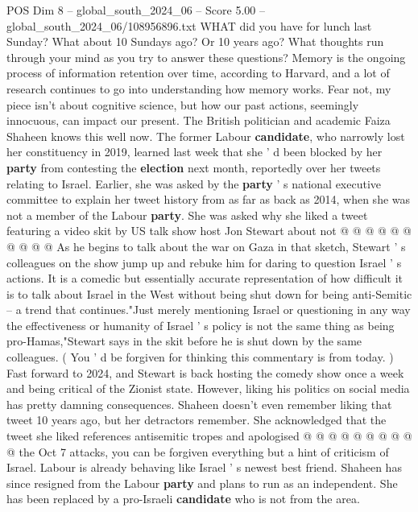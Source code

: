 \begin{textsample}{POS Dim 8 – global\_south\_2024\_06 – Score 5.00 – global\_south\_2024\_06/108956896.txt}  \label{ex:f8_pos_218}
WHAT did you have for lunch last Sunday?
What about 10 Sundays ago?
Or 10 years ago?
What thoughts run through your mind as you try to answer these questions?
Memory is the ongoing process of information retention over time, according to Harvard, and a lot of research continues to go into understanding how memory works.
Fear not, my piece isn't about cognitive science, but how our past actions, seemingly innocuous, can impact our present.
The British politician and academic Faiza Shaheen knows this well now.
The former Labour \textbf{candidate}, who narrowly lost her constituency in 2019, learned last week that she ' d been blocked by her \textbf{party} from contesting the \textbf{election} next month, reportedly over her tweets relating to Israel.
Earlier, she was asked by the \textbf{party} ' s national executive committee to explain her tweet history from as far as back as 2014, when she was not a member of the Labour \textbf{party}.
She was asked why she liked a tweet featuring a video skit by US talk show host Jon Stewart about not @ @ @ @ @ @ @ @ @ @ As he begins to talk about the war on Gaza in that sketch, Stewart ' s colleagues on the show jump up and rebuke him for daring to question Israel ' s actions.
It is a comedic but essentially accurate representation of how difficult it is to talk about Israel in the West without being shut down for being anti-Semitic -- a trend that continues."Just merely mentioning Israel or questioning in any way the effectiveness or humanity of Israel ' s policy is not the same thing as being pro-Hamas,"Stewart says in the skit before he is shut down by the same colleagues. ( You ' d be forgiven for thinking this commentary is from today. ) Fast forward to 2024, and Stewart is back hosting the comedy show once a week and being critical of the Zionist state.
However, liking his politics on social media has pretty damning consequences.
Shaheen doesn't even remember liking that tweet 10 years ago, but her detractors remember.
She acknowledged that the tweet she liked references antisemitic tropes and apologised @ @ @ @ @ @ @ @ @ @ the Oct 7 attacks, you can be forgiven everything but a hint of criticism of Israel.
Labour is already behaving like Israel ' s newest best friend.
Shaheen has since resigned from the Labour \textbf{party} and plans to run as an independent.
She has been replaced by a pro-Israeli \textbf{candidate} who is not from the area.

\end{textsample}
